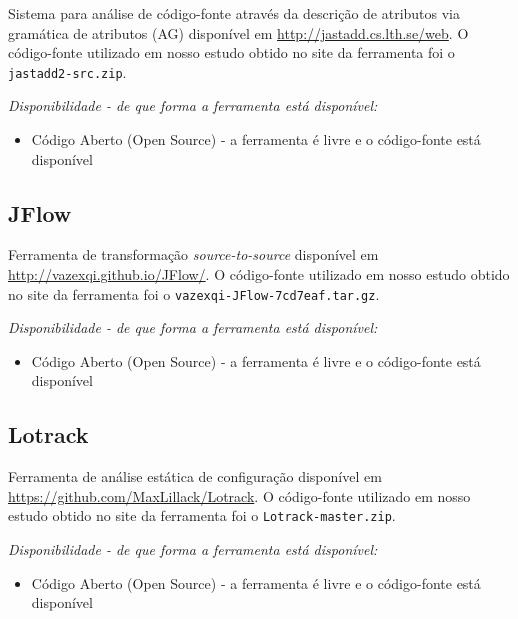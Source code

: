 Sistema para análise de código-fonte através da descrição de
atributos via gramática de atributos (AG) disponível em \url{http://jastadd.cs.lth.se/web}. O código-fonte
utilizado em nosso estudo obtido no site da ferramenta foi o
\texttt{jastadd2-src.zip}.

\begin{description}

  \item {\it Disponibilidade - de que forma a ferramenta está disponível:}
    \begin{itemize}
      \item Código Aberto (Open Source) - a ferramenta é livre e o código-fonte está disponível
    \end{itemize}

\end{description}

\subsection{JFlow}

Ferramenta de transformação {\it source-to-source} disponível em
\url{http://vazexqi.github.io/JFlow/}. O código-fonte
utilizado em nosso estudo obtido no site da ferramenta foi o
\texttt{vazexqi-JFlow-7cd7eaf.tar.gz}.

\begin{description}

  \item {\it Disponibilidade - de que forma a ferramenta está disponível:}
    \begin{itemize}
      \item Código Aberto (Open Source) - a ferramenta é livre e o código-fonte está disponível
    \end{itemize}

\end{description}

\subsection{Lotrack}

Ferramenta de análise estática de configuração disponível em
\url{https://github.com/MaxLillack/Lotrack}. O código-fonte utilizado em nosso
estudo obtido no site da ferramenta foi o \texttt{Lotrack-master.zip}.

\begin{description}

  \item {\it Disponibilidade - de que forma a ferramenta está disponível:}
    \begin{itemize}
      \item Código Aberto (Open Source) - a ferramenta é livre e o código-fonte está disponível
    \end{itemize}

\end{description}


